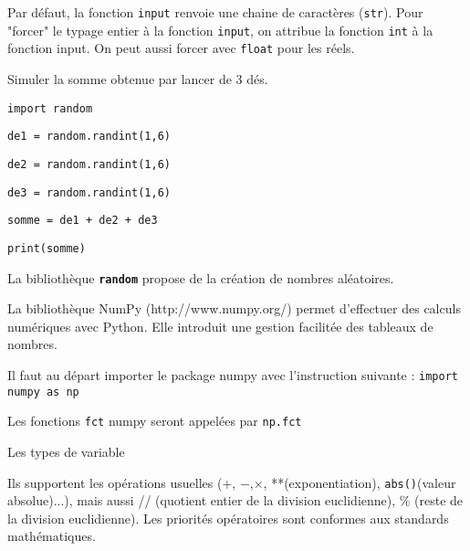 \begin{Rq}
Par défaut, la fonction \texttt{input} renvoie une chaine de caractères (\texttt{str}). Pour "forcer" le typage entier à la fonction \texttt{input}, on attribue la fonction \texttt{int} à la fonction input. On peut aussi forcer avec \texttt{float} pour les réels.
\end{Rq}

\begin{ExC}{Simuler la somme obtenue par lancer de 3 dés.}

\texttt{import random}
 
\texttt{de1 = random.randint(1,6)}

\texttt{de2 = random.randint(1,6)}

\texttt{de3 = random.randint(1,6)}

\texttt{somme = de1 + de2 + de3}
 
\texttt{print(somme)}

\end{ExC}

\begin{Rq}
La bibliothèque \texttt{\textbf{random}} propose de la création de nombres aléatoires.
\end{Rq}






\begin{Rq}
La bibliothèque NumPy (http://www.numpy.org/) permet d’effectuer des calculs numériques avec Python. Elle introduit une gestion facilitée des tableaux de nombres.

Il faut au départ importer le package numpy avec l’instruction suivante : \texttt{import numpy as np}

Les fonctions \texttt{fct} numpy seront appelées par \texttt{np.fct}
\end{Rq}


\begin{Cod}
 
\end{Cod}


 {\Large Les types de variable} 




Ils supportent les opérations usuelles (+, $-$,$ \times$, **(exponentiation), \texttt{abs()}(valeur absolue)...), mais aussi // (quotient entier de la division euclidienne), \% (reste de la division euclidienne).
Les priorités opératoires sont conformes aux standards mathématiques.

